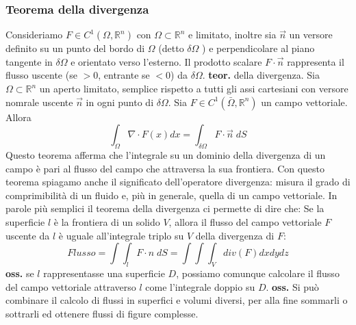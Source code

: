 \subsubsection{Teorema della divergenza}
Consideriamo $F \in C^1(\Omega, \mathbb{R}^n)$ con $\Omega \subset \mathbb{R}^n$ e limitato, inoltre sia $\vec{n}$ un versore definito su un punto del bordo di $\Omega$ (detto $\delta\Omega$ ) e perpendicolare al piano tangente in $\delta \Omega$ e orientato verso l'esterno.\newline
Il prodotto scalare $F \cdot \vec{n}$ rappresenta il flusso uscente (se $> 0$, entrante se $<0$)  da $\delta\Omega$.\newline
\newline
\textbf{teor.} della divergenza.\newline
Sia $\Omega \subset \mathbb{R}^n$ un aperto limitato, semplice rispetto a tutti gli assi cartesiani con versore nomrale uscente $\vec{n}$ in ogni punto di $\delta\Omega$. Sia $F \in C^1(\bar{\Omega}, \mathbb{R}^n)$ un campo vettoriale. Allora
\[
    \int_\Omega \nabla \cdot  F(x) dx = \int_{\delta\Omega} F \cdot  \vec{n} \; dS
\]
Questo teorema afferma che l'integrale su un dominio della divergenza di un campo è pari al flusso del campo che attraversa la sua frontiera.\newline
Con questo teorema spiagamo anche il significato dell'operatore divergenza: misura il grado di comprimibilità di un fluido e, più in generale, quella di un campo vettoriale.\newline
\newline
In parole più semplici il teorema della divergenza ci permette di dire che:\newline
Se la superficie $l$ è la frontiera di un solido $V$, allora il flusso del campo vettoriale $F$ uscente da $l$ è uguale all'integrale triplo su $V$ della divergenza di $F$:
\[
    Flusso = \int \int_{l}F \cdot n \; dS = \int \int \int_{V} div(F) dx dy dz
\]
\textbf{oss.} se $l$ rappresentasse una superficie $D$, possiamo comunque calcolare il flusso del campo vettoriale attraverso $l$ come l'integrale doppio su $D$.\newline
\textbf{oss.} Si può combinare il calcolo di flussi in superfici e volumi diversi, per alla fine sommarli o sottrarli ed ottenere flussi di figure complesse.